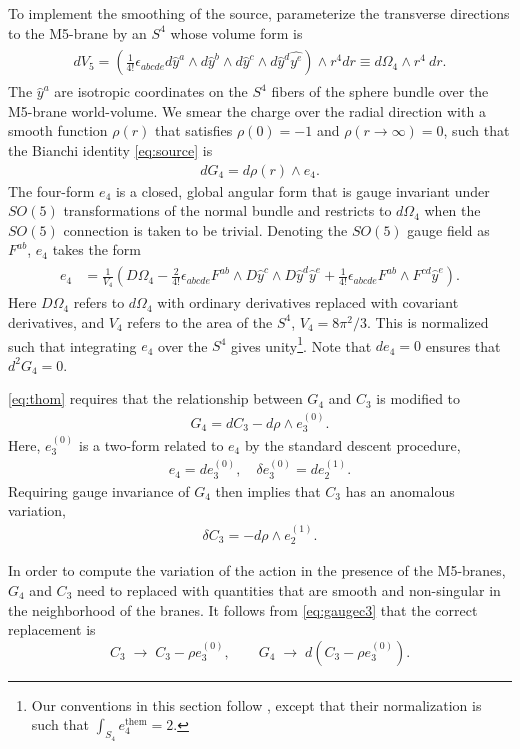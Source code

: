 \documentclass[a4paper,11pt]{article}
\newcommand{\ba}[1]{\begin{align} #1 \end{align} }
\newcommand{\bs}[1]{\begin{split} #1 \end{split} }
\begin{document}
To implement the smoothing of the source, parameterize the transverse directions to the M5-brane by an $S^4$ whose volume form is 
	\ba{\bs{
	dV_5 = \left(\frac{1}{4!} \epsilon_{abcde} d\hat{y}^a\wedge d\hat{y}^b\wedge d \hat{y}^c \wedge d\hat{y}^d \hat{y^e}\right)\wedge r^4 dr\equiv  d\Omega_4\wedge r^4\ dr.
	}}
	The $\hat{y}^a$ are isotropic coordinates on the $S^4$ fibers of the sphere bundle over the M5-brane world-volume. We smear the charge over the radial direction with a smooth function $\rho(r)$ that satisfies $\rho(0)=-1$ and $\rho(r\to\infty)=0$, such that the Bianchi identity \eqref{eq:source} is
	\ba{
	dG_4= d\rho(r) \wedge e_4. \label{eq:thom}
	}
The four-form $e_4$ is a closed, global angular form that is gauge invariant under $SO(5)$ transformations of the normal bundle and restricts to $d\Omega_4$ when the $SO(5)$ connection is taken to be trivial. Denoting the $SO(5)$ gauge field as $F^{ab}$, $e_4$ takes the form
	\ba{\bs{
	e_4 &= \frac{1}{V_4} \left( D\Omega_4 - \frac{2}{4!} \epsilon_{abcde}F^{ab}\wedge D\hat{y}^c \wedge D\hat{y}^d\hat{y}^e + \frac{1}{4!}\epsilon_{abcde}F^{ab}\wedge F^{cd}\hat{y}^e \right).
	}\label{eq:e4so5}}
Here $D\Omega_4$ refers to $d\Omega_4$ with ordinary derivatives replaced with covariant derivatives, and $V_4$ refers to the area of the $S^4$, $V_4=8\pi^2/3$. This is normalized such that integrating $e_4$ over the $S^4$ gives unity\footnote{Our conventions in this section follow \cite{Freed:1998tg}, except that their normalization is such that $\int_{S_4}e_4^{\text{them}}=2$.}. Note that $de_4=0$ ensures that $d^2G_4=0$.

\eqref{eq:thom} requires that the relationship between $G_4$ and $C_3$ is modified to
	\ba{
	G_4=dC_3-d\rho \wedge e_3^{(0)}.
	}
Here, $e_3^{(0)}$ is a two-form related to $e_4$ by the standard descent procedure,
	\ba{
	e_4=de_3^{(0)},\quad \delta e_3^{(0)}=de_2^{(1)}.
	}
Requiring gauge invariance of $G_4$ then implies that $C_3$ has an anomalous variation,
	\ba{
	\delta C_3=-d\rho\wedge e_2^{(1)}.\label{eq:gaugec3}
	}

In order to compute the variation of the action in the presence of the M5-branes, $G_4$ and $C_3$ need to replaced with quantities that are smooth and non-singular in the neighborhood of the branes.  It follows from \eqref{eq:gaugec3} that the correct replacement is
\begin{equation}
C_3 \; \to \; C_3 - \rho e_3^{(0)}, \qquad G_4 \; \to \; d \left(C_3 - \rho e_3^{(0)} \right).  \label{eq:shift}
\end{equation}
\end{document}
